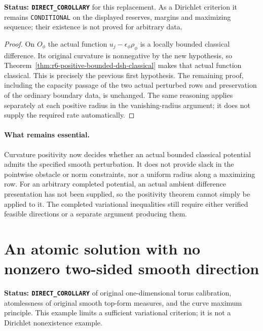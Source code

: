 \documentclass[11pt,a4paper]{article}
\numberwithin{equation}{section}
\theoremstyle{definition}
\theoremstyle{remark}
\begin{document}
\noindent\textbf{Status: \texttt{DIRECT\_COROLLARY}} for this
replacement. As a Dirichlet criterion it remains \texttt{CONDITIONAL}
on the displayed reserves, margins and maximizing sequence; their
existence is not proved for arbitrary data.

\begin{proof}
On $O_\phi$ the actual function
$u_j-\epsilon_\phi\rho_\phi$ is a locally bounded classical
difference. Its original curvature is nonnegative by the new
hypothesis, so Theorem~\ref{thm:r6-positive-bounded-dsh-classical}
makes that actual function classical. This is precisely the previous
first hypothesis. The remaining proof, including the capacity passage
of the two actual perturbed rows and preservation of the ordinary
boundary data, is unchanged. The same reasoning applies separately
at each positive radius in the vanishing-radius argument; it does
not supply the required rate automatically.
\end{proof}

\paragraph{What remains essential.}
Curvature positivity now decides whether an actual bounded classical
potential admits the specified smooth perturbation. It does not
provide slack in the pointwise obstacle or norm constraints, nor a
uniform radius along a maximizing row. For an arbitrary completed
potential, an actual ambient difference presentation has not been
supplied, so the positivity theorem cannot simply be applied to it.
The completed variational inequalities still require either verified
feasible directions or a separate argument producing them.



\section{An atomic solution with no nonzero two-sided smooth direction}
\label{sec:r6-atomic-variation-obstruction}

\noindent\textbf{Status: \texttt{DIRECT\_COROLLARY}} of original
one-dimensional torus calibration, atomlessness of original smooth
top-form measures, and the curve maximum principle. This example
limits a sufficient variational criterion; it is not a Dirichlet
nonexistence example.
\end{document}
